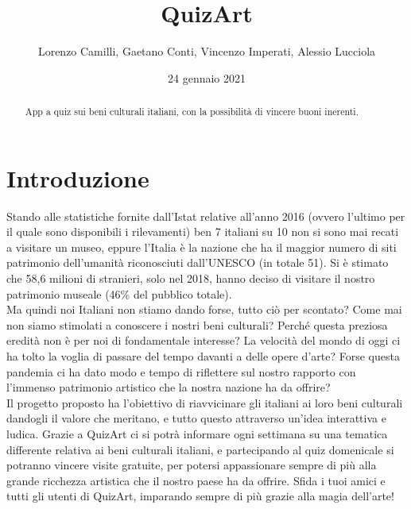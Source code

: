 \documentclass{article}
\title{\textbf{QuizArt}}
\author{Lorenzo Camilli, Gaetano Conti, Vincenzo Imperati, Alessio Lucciola}
\date{24 gennaio 2021}
\begin{document}
\maketitle

\begin{abstract}
\noindent
App a quiz sui beni culturali italiani, con la possibilità di vincere buoni inerenti.
\end{abstract}

\newpage
\tableofcontents
\newpage

\section{Introduzione}
Stando alle statistiche fornite dall’Istat relative all’anno 2016 (ovvero l’ultimo per il quale sono disponibili i rilevamenti) ben 7 italiani su 10 non si sono mai recati a visitare un museo, eppure l’Italia è la nazione che ha il maggior numero di siti patrimonio dell’umanità riconosciuti dall’UNESCO (in totale 51). Si è stimato che 58,6 milioni di stranieri, solo nel 2018, hanno deciso di visitare il nostro patrimonio museale (46\% del pubblico totale).
\\\indent
Ma quindi noi Italiani non stiamo dando forse, tutto ciò per scontato? Come mai non siamo stimolati a conoscere i nostri beni culturali? Perché questa preziosa eredità non è per noi di fondamentale interesse? La velocità del mondo di oggi ci ha tolto la voglia di passare del tempo davanti a delle opere d’arte? Forse questa pandemia ci ha dato modo e tempo di riflettere sul nostro rapporto con l’immenso patrimonio artistico che la nostra nazione ha da offrire?
\\\indent
Il progetto proposto ha l’obiettivo di riavvicinare gli italiani ai loro beni culturali dandogli il valore che meritano, e tutto questo attraverso un’idea interattiva e ludica. Grazie a QuizArt ci si potrà informare ogni settimana su una tematica differente relativa ai beni culturali italiani, e partecipando al quiz domenicale si potranno vincere visite gratuite, per potersi appassionare sempre di più alla grande ricchezza artistica che il nostro paese ha da offrire.
Sfida i tuoi amici e tutti gli utenti di QuizArt, imparando sempre di più grazie alla magia dell’arte!
\end{document}
